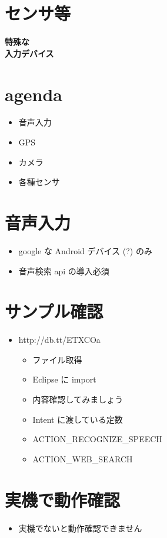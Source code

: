 \documentclass[slide,papersize]{jsarticle}
\begin{document}
\section*{センサ等}
\vspace*{13mm}
\begin{center}
{\Huge {\bf 特殊な\\入力デバイス}}
\end{center}

\section*{agenda}
\bigskip
\begin{itemize}
\item 音声入力
\bigskip
\item GPS
\bigskip
\item カメラ
\bigskip
\item 各種センサ
\end{itemize}

\section*{音声入力}
\bigskip
\begin{itemize}
\item google な Android デバイス (?) のみ
\bigskip
\item 音声検索 api の導入必須
\end{itemize}

\section*{サンプル確認}
\bigskip
\begin{itemize}
\item http://db.tt/ETXCOa
\bigskip
 \begin{itemize}
 \item ファイル取得
 \item Eclipse に import
 \item 内容確認してみましょう
 \end{itemize}
\bigskip
 \begin{itemize}
 \item Intent に渡している定数
 \item ACTION\_RECOGNIZE\_SPEECH
 \item ACTION\_WEB\_SEARCH
 \end{itemize}
\end{itemize}

\section*{実機で動作確認}
\bigskip
\begin{itemize}
\item 実機でないと動作確認できません
\end{itemize}
\end{document}
